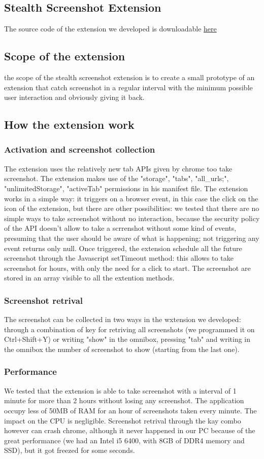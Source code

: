 \documentclass[12pt]{article}
\begin{document}
\begin{multicols}{2}
\section{Stealth Screenshot Extension}
The source code of the extension we developed is downloadable \href{URL}{here}
\subsection{Scope of the extension}
the scope of the stealth screenshot extension is to create a small prototype of an extension that catch screenshot in a regular interval with the minimum possible user interaction and obviously giving it back.
\subsection{How the extension work}
\subsubsection{Activation and screenshot collection}
The extension uses the relatively new tab APIs given by chrome too take screenshot.
The extension makes use of the "storage", "tabs", "all\_urls;", "unlimitedStorage", "activeTab" permissions in his manifest file. The extension works in a simple way: it triggers on a browser event, in this case the click on the icon of the extension, but there are other possibilities: we tested that there are no simple ways to take screenshot without no interaction, because the security policy of the API doesn't allow to take a scrrenshot without some kind of events, presuming that the user should be aware of what is happening; not triggering any event returns only null.
Once triggered, the extension schedule all the future screenshot through the Javascript setTimeout method: this allows to take screenshot for hours, with only the need for a click to start.
The screenshot are stored in an array visible to all the extention methods.
\subsubsection{Screenshot retrival}
The screenshot can be collected in two ways in the wxtension we developed:
through a combination of key for retriving all screenshots (we programmed it on Ctrl+Shift+Y) or writing "show" in the omnibox, pressing "tab" and writing in the omnibox the number of screenshot to show (starting from the last one).
\subsubsection{Performance}
We tested that the extension is able to take screenshot with a interval of 1 minute for more than 2 hours without losing any screenshot.
The application occupy less of 50MB of RAM for an hour of screenshots taken every minute. The impact on the CPU is negligible.
Screenshot retrival through the kay combo however can  crash chrome, although it never happened in our PC because of the great performance (we had an Intel i5 6400, with 8GB of DDR4 memory and SSD), but it got freezed for some seconds.

\end{multicols}
\end{document}
